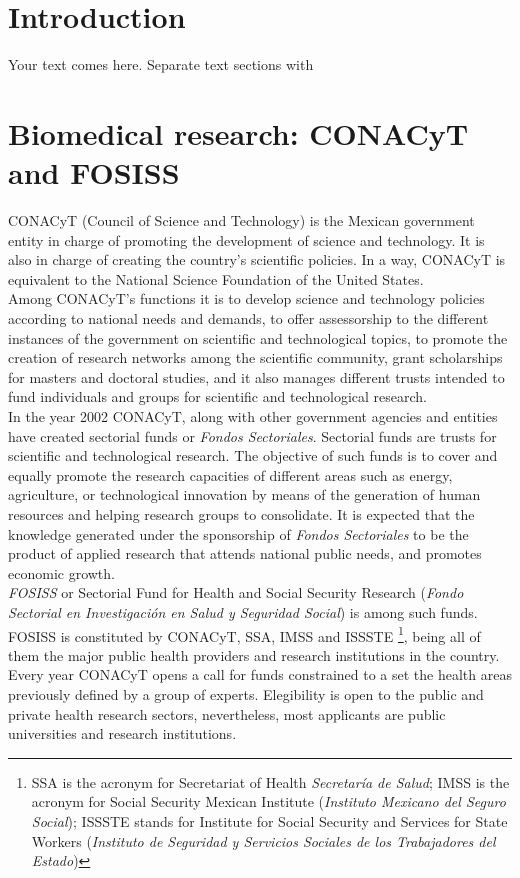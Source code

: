 \section{Introduction}
\label{intro}

Your text comes here. Separate text sections with



\section{Biomedical research: CONACyT and FOSISS}
\label{sec:1}
CONACyT (Council of Science and Technology) is the Mexican government
entity in charge of promoting the development of science and 
technology. It is also in charge of creating the country's scientific
policies. In a way, CONACyT is equivalent to the National Science
Foundation of the United States.\\

Among CONACyT's functions it is to develop science and technology
policies according to national needs and demands, to offer
assessorship to the different instances of the government on
scientific and technological topics, to promote the creation of
research networks among the scientific community, grant scholarships
for masters and doctoral studies, and it also manages different trusts
intended to fund individuals and groups for scientific and
technological research.\\

In the year 2002 CONACyT, along with other government agencies and
entities have created sectorial funds or \emph{Fondos Sectoriales}.
Sectorial funds are trusts for scientific and technological research.
The objective of such funds is to cover and equally promote the
research capacities of different areas such as energy, agriculture, or
technological innovation by means of the generation of human resources
and helping research groups to consolidate. It is expected that the
knowledge generated under the sponsorship of \emph{Fondos Sectoriales}
to be the product of applied research that attends national public
needs, and promotes economic growth.\\

\emph{FOSISS} or Sectorial Fund for Health and Social Security
Research (\emph{Fondo Sectorial en Investigaci\'on en Salud y
  Seguridad Social}) is among such funds. FOSISS is constituted by
CONACyT, SSA, IMSS and ISSSTE \footnote{SSA is the acronym for
  Secretariat of Health \emph{Secretar\'ia de Salud}; IMSS is the
  acronym for Social Security Mexican Institute (\emph{Instituto
    Mexicano del Seguro Social}); ISSSTE stands for Institute for
  Social Security and Services for State Workers (\emph{Instituto de
    Seguridad y Servicios Sociales de los Trabajadores del Estado})},
being all of them the major public health providers and research
institutions in the country. Every year CONACyT opens a call for funds
constrained to a set the health areas previously defined by a group of
experts. Elegibility is open to the public and private health research
sectors, nevertheless, most applicants are public universities and
research institutions.  


